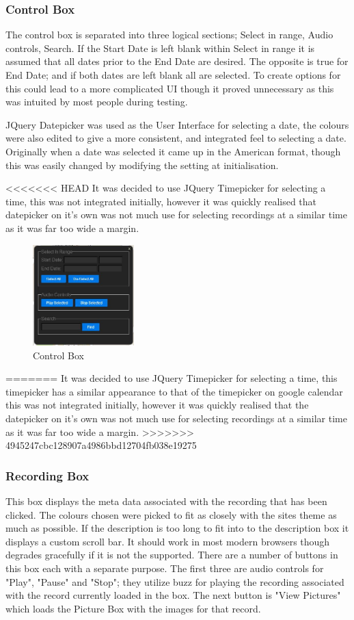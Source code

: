 \documentclass{l3proj}
\begin{document}
\subsubsection{Control Box}
The control box is separated into three logical sections; Select in
range, Audio controls, Search. If the Start Date is left blank within
Select in range it is assumed that all dates prior to the End Date are
desired. The opposite is true for End Date; and if both dates are left
blank all are selected. To create options for this could lead to a
more complicated UI though it proved unnecessary as this was intuited
by most people during testing.

JQuery Datepicker was used as the User Interface for selecting a date,
the colours were also edited to give a more consistent, and integrated
feel to selecting a date. Originally when a date was selected it came
up in the American format, though this was easily changed by modifying
the setting at initialisation.

<<<<<<< HEAD
It was decided to use JQuery Timepicker for selecting a time, this was
not integrated initially, however it was quickly realised that
datepicker on it's own was not much use for selecting recordings at a
similar time as it was far too wide a margin.
\begin{figure}[ht!]
  \centering
\includegraphics[width=0.35\textwidth]{images/ctrl-box.jpg}
\caption{Control Box}
\end{figure}
=======
It was decided to use JQuery Timepicker for selecting a time, this 
timepicker has a similar appearance to that of the timepicker on google 
calendar this was not integrated initially, however it was quickly 
realised that the datepicker on it's own was not much use for selecting 
recordings at a similar time as it was far too wide a margin. 
>>>>>>> 4945247cbc128907a4986bbd12704fb038e19275

\subsubsection{Recording Box}
This box displays the meta data associated with the recording that has
been clicked. The colours chosen were picked to fit as closely with
the sites theme as much as possible. If the description is too long to
fit into to the description box it displays a custom  scroll bar. It
should work in most modern browsers though degrades gracefully if it
is not the supported. There are a number of buttons in this box each with 
a separate purpose. The first three are audio controls for "Play", 
"Pause" and "Stop"; they utilize buzz for playing the recording 
associated with the record currently loaded in the box. The next button 
is "View Pictures" which loads the Picture Box with the images for that 
record.
\end{document}
